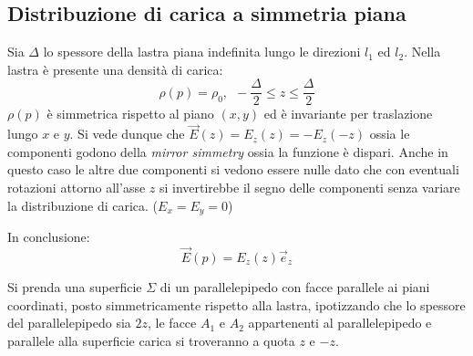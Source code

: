 \subsection{Distribuzione di carica a simmetria piana}
Sia $\Delta$ lo spessore della lastra piana indefinita lungo le direzioni $l_1$ ed $l_2$.
Nella lastra è presente una densità di carica:
$$
\rho(p) = \rho_0, \ \  -\frac{\Delta}{2} \leq z \leq \frac{\Delta}{2}
$$
$\rho(p)$ è simmetrica rispetto al piano $(x,y)$ ed è invariante per traslazione lungo $x$ e $y$.
Si vede dunque che $\vec{E}(z) = E_z(z) = - E_z(-z)$ ossia le componenti godono della 
\textit{mirror simmetry} ossia la funzione è dispari.
Anche in questo caso le altre due componenti si vedono essere nulle dato che con eventuali
rotazioni attorno all'asse $z$ si invertirebbe il segno delle componenti senza variare
la distribuzione di carica. ($E_x=E_y=0$)

In conclusione:
$$
\vec{E}(p) = E_z(z)\vec{e}_z
$$

Si prenda una superficie $\Sigma$ di un parallelepipedo con facce parallele
ai piani coordinati, posto simmetricamente rispetto alla lastra, ipotizzando che lo spessore del 
parallelepipedo sia $2z$, le facce $A_1$ e $A_2$ appartenenti al parallelepipedo e parallele
alla superficie carica si troveranno a quota $z$ e $-z$.

